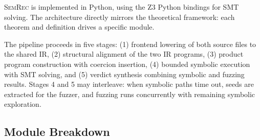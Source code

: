 \documentclass[11pt]{article}
\begin{document}
\textsc{SemRec} is implemented in Python, using the Z3 Python bindings for SMT solving. The architecture directly mirrors the theoretical framework: each theorem and definition drives a specific module.

The pipeline proceeds in five stages: (1) frontend lowering of both source files to the shared IR, (2) structural alignment of the two IR programs, (3) product program construction with coercion insertion, (4) bounded symbolic execution with SMT solving, and (5) verdict synthesis combining symbolic and fuzzing results. Stages 4 and 5 may interleave: when symbolic paths time out, seeds are extracted for the fuzzer, and fuzzing runs concurrently with remaining symbolic exploration.

\subsection{Module Breakdown}
\label{sec:impl-modules}
\end{document}
